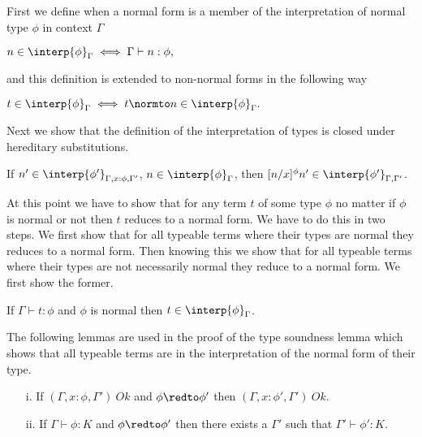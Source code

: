 \begin{definition}
  \label{def:interpretation_of_types_stlc}
  First we define when a normal form is a member of the interpretation of normal type $\phi$ in context $\Gamma$
  \begin{center}
    \begin{math}
    n \in \interp{\phi}_\Gamma \iff \Gamma \vdash n:\phi,
  \end{math}
  \end{center}
  and this definition is extended to non-normal forms in the following way
  \begin{center}
    \begin{math}
    t \in \interp{\phi}_\Gamma \iff t \normto n \in \interp{\phi}_\Gamma.
  \end{math}
  \end{center}
\end{definition}

\noindent 
Next we show that the definition of the interpretation of types is closed under
hereditary substitutions.  

\begin{lemma}
  If $n' \in \interp{\phi'}_{\Gamma,x:\phi,\Gamma'}$, $n \in \interp{\phi}_\Gamma$, then 
  $[n/x]^\phi n' \in \interp{\phi'}_{\Gamma,\Gamma'}$.
  
  \label{lemma:interpretation_of_types_closed_substitution_stlc}
\end{lemma}

At this point we have to show that for any term $t$ of some type
$\phi$ no matter if $\phi$ is normal or not then $t$ reduces to a
normal form. We have to do this in two steps.  We first show that for
all typeable terms where their types are normal they reduces to a
normal form.  Then knowing this we show that for all typeable terms
where their types are not necessarily normal they reduce to a normal
form.  We first show the former.
\begin{thm}
  If $\Gamma \vdash t:\phi$ and $\phi$ is normal then $t \in \interp{\phi}_\Gamma$.
  \label{thm:soundness__normal_ssfw}
\end{thm}
\noindent
The following lemmas are used in the proof of the type soundness lemma
which shows that all typeable terms are in the interpretation of the
normal form of their type.
\begin{lemma}
  \label{lemma:preservation_for_kinding_ssfw}
  \begin{itemize}
  \item[]
  \item[i.] If $(\Gamma,x:\phi,\Gamma')\ Ok$ and $\phi \redto \phi'$ then $(\Gamma,x:\phi',\Gamma')\ Ok$.
  \item[ii.] If $\Gamma \vdash \phi:K$ and $\phi \redto \phi'$ then there exists a $\Gamma'$ such that $\Gamma' \vdash \phi':K$.
  \end{itemize}
\end{lemma}

